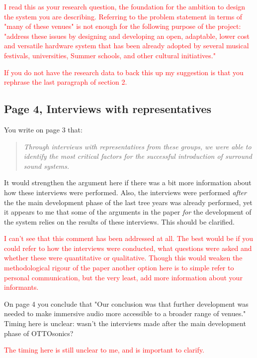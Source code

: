 \documentclass[11pt]{article}
\begin{document}
\textcolor{red}{I read this as your research question, the foundation for the ambition to design the system you are describing. Referring to the problem statement in terms of "many of these venues" is not enough for the following purpose of the project: "address these issues by designing and developing an open, adaptable, lower cost and versatile hardware system that has been already adopted by several musical festivals, universities, Summer schools, and other cultural initiatives."}

\textcolor{red}{If you do not have the research data to back this up my suggestion is that you rephrase the last paragraph of section 2.}
\subsection*{Page 4, Interviews with representatives}
\label{sec:org0c2848a}
You write on page 3 that: 
\begin{quote}
\emph{Through interviews with representatives from these groups, we were able to identify the most critical factors for the successful introduction of surround sound systems.}
\end{quote}
It would strengthen the argument here if there was a bit more information about how these interviews were performed. Also, the interviews were performed \emph{after} the the main development phase of the last tree years was already performed, yet it appears to me that some of the arguments in the paper \emph{for} the development of the system relies on the results of these interviews. This should be clarified.

\textcolor{red}{I can't see that this comment has been addressed at all. The best would be if you could refer to how the interviews were conducted, what questions were asked and whether these were quantitative or qualitative. Though this would weaken the methodological rigour of the paper another option here is to simple refer to personal communication, but the very least, add more information about your informants.}
\vspace{0.5cm}

On page 4 you conclude that  "Our conclusion was that further development was needed to make immersive audio more accessible to a broader range of venues." Timing here is unclear: wasn't the interviews made after the main development phase of OTTOsonics?
\vspace{0.5cm}

\textcolor{red}{The timing here is still unclear to me, and is important to clarify. }
\end{document}
